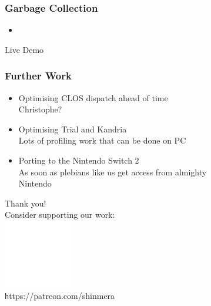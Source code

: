 \documentclass[14pt,t,aspectratio=169]{beamer}
\begin{document}
\begin{frame}
  \frametitle{Garbage Collection}
  \begin{itemize}
  \item 
  \end{itemize}
\end{frame}


\begin{frame}[c]{ }
  \centering
  {\Huge Live Demo}
\end{frame}

\begin{frame}
  \frametitle{Further Work}
  \begin{itemize}
  \item Optimising CLOS dispatch ahead of time \\
    \Rightarrow Christophe? 
  \item Optimising Trial and Kandria \\
    \Rightarrow Lots of profiling work that can be done on PC
  \item Porting to the Nintendo Switch 2 \\
    \Rightarrow As soon as plebians like us get access from almighty \\\quad Nintendo
  \end{itemize}
\end{frame}

{
  \begin{frame}[c]{ }
    \centering\color{white}
    \vspace{2cm}
    {\LARGE Thank you!} \\
    \vspace{0.2cm}
    Consider supporting our work: \\
    \includegraphics[width=3cm]{patreon} \\
    {\texttt https://patreon.com/shinmera}
  \end{frame}}
\end{document}
